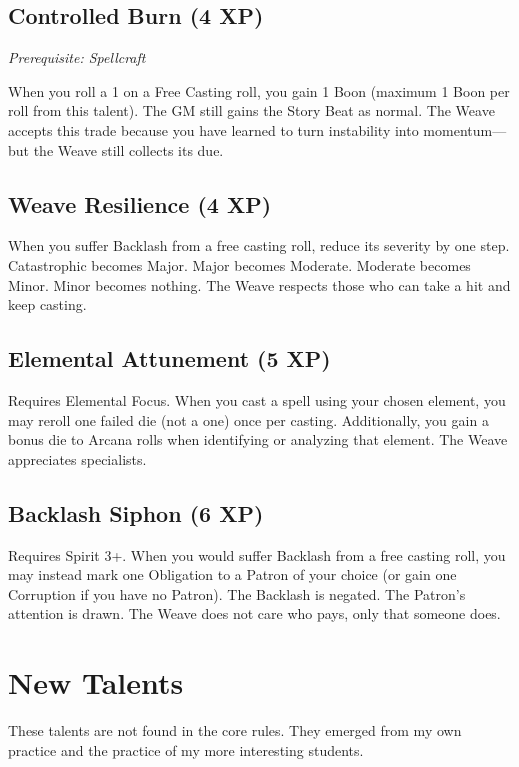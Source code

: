 \subsection{Controlled Burn (4 XP)}

\emph{Prerequisite: Spellcraft}

When you roll a 1 on a Free Casting roll, you gain 1 Boon (maximum 1 Boon per roll from this talent). The GM still gains the Story Beat as normal. The Weave accepts this trade because you have learned to turn instability into momentum---but the Weave still collects its due.

\subsection{Weave Resilience (4 XP)}

When you suffer Backlash from a free casting roll, reduce its severity by one step. Catastrophic becomes Major. Major becomes Moderate. Moderate becomes Minor. Minor becomes nothing. The Weave respects those who can take a hit and keep casting.

\subsection{Elemental Attunement (5 XP)}

Requires Elemental Focus. When you cast a spell using your chosen element, you may reroll one failed die (not a one) once per casting. Additionally, you gain a bonus die to Arcana rolls when identifying or analyzing that element. The Weave appreciates specialists.

\subsection{Backlash Siphon (6 XP)}

Requires Spirit 3+. When you would suffer Backlash from a free casting roll, you may instead mark one Obligation to a Patron of your choice (or gain one Corruption if you have no Patron). The Backlash is negated. The Patron's attention is drawn. The Weave does not care who pays, only that someone does.

\section{New Talents}

These talents are not found in the core rules. They emerged from my own practice and the practice of my more interesting students.

